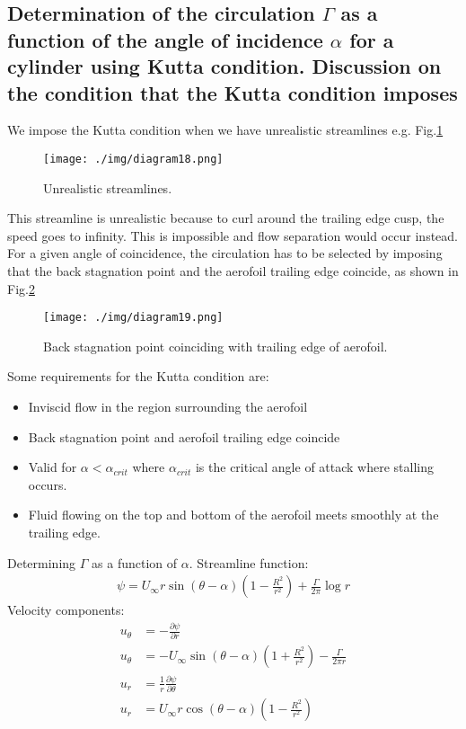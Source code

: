 \subsection{Determination of the circulation $\Gamma$ as a function of the angle of incidence $\alpha$ for a cylinder using Kutta condition. Discussion on the condition that the Kutta condition imposes}
We impose the Kutta condition when we have unrealistic streamlines e.g. Fig.\ref{unrealisticstreamline}
\begin{figure}[H]
    \centering
    \texttt{[image: ./img/diagram18.png]}
    \caption{Unrealistic streamlines.}
    \label{unrealisticstreamline}
\end{figure}
This streamline is unrealistic because to curl around the trailing edge cusp, the speed goes to infinity. This is impossible and flow separation would occur instead. For a given angle of coincidence, the circulation has to be selected by imposing that the back stagnation point and the aerofoil trailing edge coincide, as shown in Fig.\ref{goodkutta}
\begin{figure}[H]
    \centering
    \texttt{[image: ./img/diagram19.png]}
    \caption{Back stagnation point coinciding with trailing edge of aerofoil.}
    \label{goodkutta}
\end{figure}
Some requirements for the Kutta condition are:
\begin{itemize}
    \item Inviscid flow in the region surrounding the aerofoil
    \item Back stagnation point and aerofoil trailing edge coincide
    \item Valid for $\alpha < \alpha_{crit}$ where $\alpha_{crit}$ is the critical angle of attack where stalling occurs.
    \item Fluid flowing on the top and bottom of the aerofoil meets smoothly at the trailing edge.
\end{itemize}
Determining $\Gamma$ as a function of $\alpha$. Streamline function:
\begin{align}
    \psi = U_{\infty}r \sin\left(\theta-\alpha\right) \left(1 - \frac{R^2}{r^2}\right) + \frac{\Gamma}{2\pi}\log r
\end{align}
Velocity components:
\begin{align}
    u_{\theta} & = -\frac{\partial \psi}{\partial r}                                                                   \\
    u_{\theta} & = -U_{\infty} \sin\left(\theta-\alpha\right) \left(1 + \frac{R^2}{r^2}\right) - \frac{\Gamma}{2\pi r} \\
    u_r        & = \frac{1}{r} \frac{\partial \psi}{\partial \theta}                                                   \\
    u_r        & = U_{\infty} r\cos\left(\theta-\alpha\right) \left(1-\frac{R^2}{r^2}\right)
\end{align}
